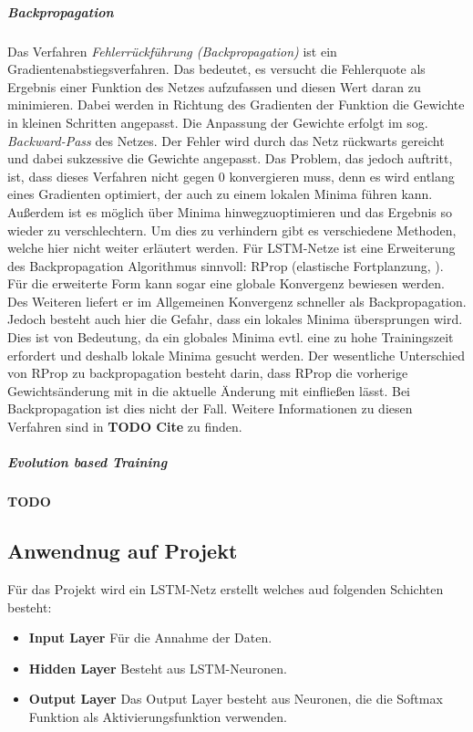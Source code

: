 \subparagraph{Backpropagation}
Das Verfahren \textit{Fehlerrückführung (Backpropagation)} ist ein
Gradientenabstiegsverfahren. Das bedeutet, es versucht die Fehlerquote als
Ergebnis einer Funktion des Netzes aufzufassen und diesen Wert daran zu
minimieren. Dabei werden in Richtung des Gradienten der Funktion die Gewichte in
kleinen Schritten angepasst. Die Anpassung der Gewichte erfolgt im sog.
\textit{Backward-Pass} des Netzes. Der Fehler wird durch das Netz rückwarts
gereicht und dabei sukzessive die Gewichte angepasst. Das Problem, das jedoch
auftritt, ist, dass dieses Verfahren nicht gegen 0 konvergieren muss, denn es
wird entlang eines Gradienten optimiert, der auch zu einem lokalen Minima führen
kann. Außerdem ist es möglich über Minima hinwegzuoptimieren und das Ergebnis so
wieder zu verschlechtern. Um dies zu verhindern gibt es verschiedene Methoden,
welche hier nicht weiter erläutert werden. Für \ac{LSTM}-Netze ist eine
Erweiterung des Backpropagation Algorithmus sinnvoll:
\acl{RProp} (elastische Fortplanzung, ). Für die erweiterte Form
kann sogar eine globale Konvergenz bewiesen werden. Des Weiteren liefert er im
Allgemeinen Konvergenz schneller als Backpropagation. Jedoch besteht auch hier
die Gefahr, dass ein lokales Minima übersprungen wird. Dies ist von Bedeutung,
da ein globales Minima evtl. eine zu hohe Trainingszeit erfordert und deshalb
lokale Minima gesucht werden. Der wesentliche Unterschied von \ac{RProp} zu
backpropagation besteht darin, dass \ac{RProp} die vorherige Gewichtsänderung
mit in die aktuelle Änderung mit einfließen lässt. Bei Backpropagation ist dies
nicht der Fall. Weitere Informationen zu diesen Verfahren sind in
\cite{RainerSchmoll2006} \textbf{TODO Cite} zu finden. 

\subparagraph{Evolution based Training}

\textbf{TODO}


\subsection{Anwendnug auf Projekt}
Für das Projekt wird ein LSTM-Netz erstellt welches aud folgenden Schichten besteht:

\begin{itemize}
\item \textbf{Input Layer} Für die Annahme der Daten.
\item \textbf{Hidden Layer} Besteht aus LSTM-Neuronen.
\item \textbf{Output Layer} Das Output Layer besteht aus Neuronen, die die 
Softmax Funktion als Aktivierungsfunktion verwenden.
\end{itemize}

